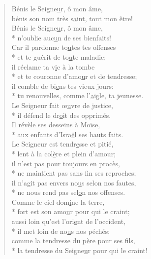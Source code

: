 
\begin{verse}
Bénis le Seigne\underline{u}r, ô mon âme, \\
bénis son nom très s\underline{a}int, tout mon être! \\
Bénis le Seigne\underline{u}r, ô mon âme, \\*
n’oublie auc\underline{u}n de ses bienfaits! \\

Car il pardonne to\underline{u}tes tes offenses \\*
et te guérit de to\underline{u}te maladie; \\
il réclame ta v\underline{i}e à la tombe \\*
et te couronne d’amo\underline{u}r et de tendresse; \\
il comble de bi\underline{e}ns tes vieux jours: \\*
tu renouvelles, comme l’\underline{a}igle, ta jeunesse. \\

Le Seigneur fait œ\underline{u}vre de justice, \\*
il défend le dr\underline{o}it des opprimés. \\
Il révèle ses dess\underline{e}ins à Moïse, \\*
aux enfants d’Isra\underline{ë}l ses hauts faits. \\

Le Seigneur est tendr\underline{e}sse et pitié, \\*
lent à la col\underline{è}re et plein d’amour; \\
il n’est pas pour toujo\underline{u}rs en procès, \\*
ne maintient pas sans f\underline{i}n ses reproches; \\
il n’agit pas envers no\underline{u}s selon nos fautes, \\*
ne nous rend pas sel\underline{o}n nos offenses. \\

Comme le ciel dom\underline{i}ne la terre, \\*
fort est son amo\underline{u}r pour qui le craint; \\
aussi loin qu’est l’ori\underline{e}nt de l’occident, \\*
il met loin de no\underline{u}s nos péchés; \\
comme la tendresse du p\underline{è}re pour ses fils, \\*
la tendresse du Seigne\underline{u}r pour qui le craint! \\


\end{verse}
